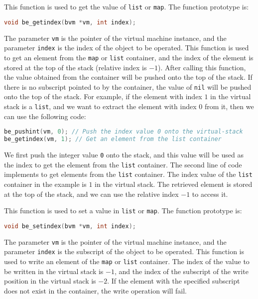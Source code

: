 
This function is used to get the value of \texttt{list} or \texttt{map}. The function prototype is:
\begin{lstlisting}[language=c, style=berry, numbers=none]
void be_getindex(bvm *vm, int index);
\end{lstlisting}
The parameter \texttt{vm} is the pointer of the virtual machine instance, and the parameter \texttt{index} is the index of the object to be operated. This function is used to get an element from the \texttt{map} or \texttt{list} container, and the index of the element is stored at the top of the stack (relative index is $-1$). After calling this function, the value obtained from the container will be pushed onto the top of the stack. If there is no subscript pointed to by the container, the value of \texttt{nil} will be pushed onto the top of the stack. For example, if the element with index $1$ in the virtual stack is a \texttt{list}, and we want to extract the element with index $0$ from it, then we can use the following code:\begin{lstlisting}[language=c, style=berry]
be_pushint(vm, 0); // Push the index value 0 onto the virtual-stack
be_getindex(vm, 1); // Get an element from the list container
\end{lstlisting}
We first push the integer value \texttt{0} onto the stack, and this value will be used as the index to get the element from the \texttt{list} container. The second line of code implements to get elements from the \texttt{list} container. The index value of the \texttt{list} container in the example is $1$ in the virtual stack. The retrieved element is stored at the top of the stack, and we can use the relative index $-1$ to access it.


This function is used to set a value in \texttt{list} or \texttt{map}. The function prototype is:
\begin{lstlisting}[language=c, style=berry, numbers=none]
void be_setindex(bvm *vm, int index);
\end{lstlisting}
The parameter \texttt{vm} is the pointer of the virtual machine instance, and the parameter \texttt{index} is the subscript of the object to be operated. This function is used to write an element of the \texttt{map} or \texttt{list} container. The index of the value to be written in the virtual stack is $-1$, and the index of the subscript of the write position in the virtual stack is $-2$. If the element with the specified subscript does not exist in the container, the write operation will fail.

